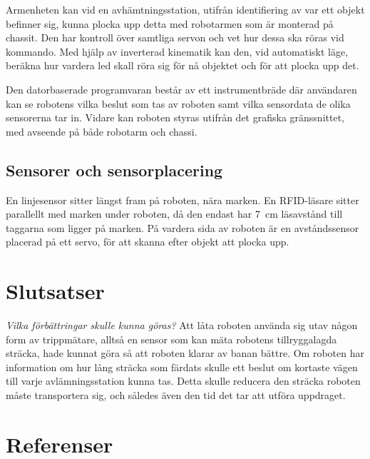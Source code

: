 \documentclass[a4paper,12pt]{article}
\begin{document}
Armenheten kan vid en avhämtningsstation, utifrån identifiering av var ett objekt befinner sig, kunna plocka upp detta med robotarmen som är monterad på chassit. Den har kontroll över samtliga servon och vet hur dessa ska röras vid kommando. Med hjälp av inverterad kinematik kan den, vid automatiskt läge, beräkna hur vardera led skall röra sig för nå objektet och för att plocka upp det.

Den datorbaserade programvaran består av ett instrumentbräde där användaren kan se robotens vilka beslut som tas av roboten samt vilka sensordata de olika sensorerna tar in. Vidare kan roboten styras utifrån det grafiska gränssnittet, med avseende på både robotarm och chassi.

\subsection{Sensorer och sensorplacering}

En linjesensor sitter längst fram på roboten, nära marken. En RFID-läsare sitter parallellt med marken under roboten, då den endast har 7~cm läsavstånd till taggarna som ligger på marken. På vardera sida av roboten är en avståndssensor placerad på ett servo, för att skanna efter objekt att plocka upp.









\section{Slutsatser}
\emph{Vilka förbättringar skulle kunna göras?}
Att låta roboten använda sig utav någon form av trippmätare, alltså en sensor som kan mäta robotens tillryggalagda sträcka, hade kunnat göra så att roboten klarar av banan bättre. Om roboten har information om hur lång sträcka som färdats skulle ett beslut om kortaste vägen till varje avlämningsstation kunna tas. Detta skulle reducera den sträcka roboten måste transportera sig, och således även den tid det tar att utföra uppdraget.
\newpage
\section*{Referenser}


\newpage
\appendix

\end{document}
